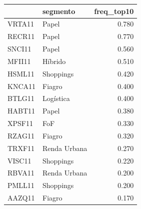 \begin{tabular}{llr}
\toprule
 & segmento & freq\_top10 \\
\midrule
VRTA11 & Papel & 0.780 \\
RECR11 & Papel & 0.770 \\
SNCI11 & Papel & 0.560 \\
MFII11 & Híbrido & 0.510 \\
HSML11 & Shoppings & 0.420 \\
KNCA11 & Fiagro & 0.400 \\
BTLG11 & Logística & 0.400 \\
HABT11 & Papel & 0.380 \\
XPSF11 & FoF & 0.330 \\
RZAG11 & Fiagro & 0.320 \\
TRXF11 & Renda Urbana & 0.270 \\
VISC11 & Shoppings & 0.220 \\
RBVA11 & Renda Urbana & 0.200 \\
PMLL11 & Shoppings & 0.200 \\
AAZQ11 & Fiagro & 0.170 \\
\bottomrule
\end{tabular}
